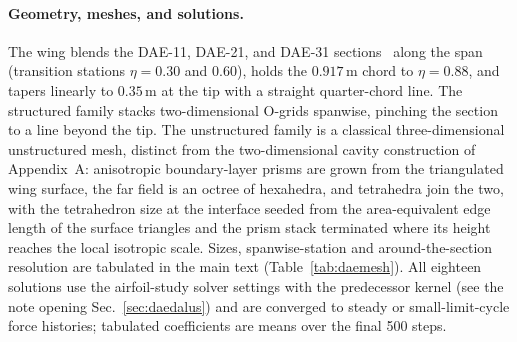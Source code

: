 \documentclass[journal]{new-aiaa}
\begin{document}
\paragraph{Geometry, meshes, and solutions.} The wing blends the
DAE-11, DAE-21, and DAE-31 sections~\cite{drela_daedalus_1988} along
the span (transition stations $\eta\!=\!0.30$ and $0.60$), holds the
$0.917\,$m chord to $\eta\!=\!0.88$, and tapers linearly to $0.35\,$m
at the tip with a straight quarter-chord line. The structured family
stacks two-dimensional O-grids spanwise, pinching the section to a line
beyond the tip. The unstructured family is a classical
three-dimensional unstructured mesh, distinct from the two-dimensional
cavity construction of Appendix~A: anisotropic boundary-layer prisms
are grown from the triangulated wing surface, the far field is an
octree of hexahedra, and tetrahedra join the two, with the tetrahedron
size at the interface seeded from the area-equivalent edge length of
the surface triangles and the prism stack terminated where its height
reaches the local isotropic scale. Sizes, spanwise-station and
around-the-section resolution are tabulated in the main text
(Table~\ref{tab:daemesh}). All eighteen solutions use the
airfoil-study solver settings with the predecessor kernel (see the note
opening Sec.~\ref{sec:daedalus}) and are converged to
steady or small-limit-cycle force histories; tabulated coefficients are
means over the final 500 steps.
\end{document}
